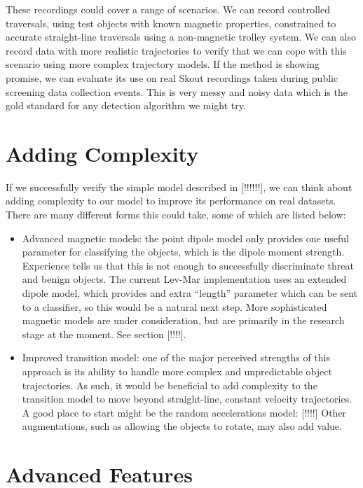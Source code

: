 \documentclass[10pt, a4paper, twocolumn]{article} %
\begin{document}
These recordings could cover a range of scenarios. We can record controlled traversals, using test objects with known magnetic properties, constrained to accurate straight-line traversals using a non-magnetic trolley system. We can also record data with more realistic trajectories to verify that we can cope with this scenario using more complex trajectory models. If the method is showing promise, we can evaluate its use on real Skout recordings taken during public screening data collection events. This is very messy and noisy data which is the gold standard for any detection algorithm we might try.

\section{Adding Complexity}

If we successfully verify the simple model described in [!!!!!!], we can think about adding complexity to our model to improve its performance on real datasets. There are many different forms this could take, some of which are listed below:

\begin{itemize}
	\item Advanced magnetic models: the point dipole model only provides one useful parameter for classifying the objects, which is the dipole moment strength. Experience tells us that this is not enough to successfully discriminate threat and benign objects. The current Lev-Mar implementation uses an extended dipole model, which provides and extra “length” parameter which can be sent to a classifier, so this would be a natural next step. More sophisticated magnetic models are under consideration, but are primarily in the research stage at the moment. See section [!!!!].
	
	\item Improved transition model: one of the major perceived strengths of this approach is its ability to handle more complex and unpredictable object trajectories. As such, it would be beneficial to add complexity to the transition model to move beyond straight-line, constant velocity trajectories. A good place to start might be the random accelerations model: [!!!!] Other augmentations, such as allowing the objects to rotate, may also add value.
	
\end{itemize}

\section{Advanced Features}
\end{document}
